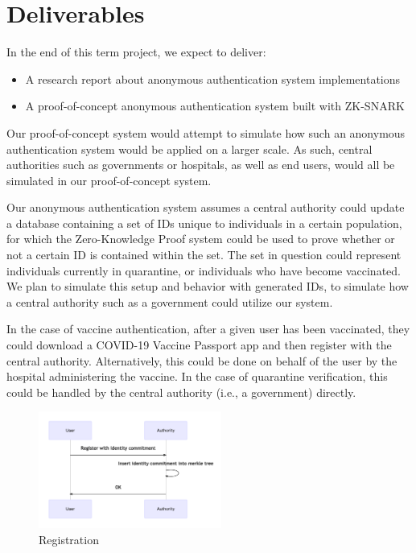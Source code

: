 \documentclass[sigconf, nonacm=true]{acmart}
\begin{document}
\section{Deliverables}
In the end of this term project, we expect to deliver:
\begin{itemize}
    \item A research report about anonymous authentication system implementations
    \item A proof-of-concept anonymous authentication system built with ZK-SNARK
\end{itemize}

Our proof-of-concept system would attempt to simulate how such an anonymous authentication system would be applied on a larger scale. As such, central authorities such as governments or hospitals, as well as end users, would all be simulated in our proof-of-concept system.

Our anonymous authentication system assumes a central authority could update a database containing a set of IDs unique to individuals in a certain population, for which the Zero-Knowledge Proof system could be used to prove whether or not a certain ID is contained within the set. The set in question could represent individuals currently in quarantine, or individuals who have become vaccinated. We plan to simulate this setup and behavior with generated IDs, to simulate how a central authority such as a government could utilize our system.

In the case of vaccine authentication, after a given user has been vaccinated, they could download a COVID-19 Vaccine Passport app and then register with the central authority. Alternatively, this could be done on behalf of the user by the hospital administering the vaccine. In the case of quarantine verification, this could be handled by the central authority (i.e., a government) directly.

\begin{figure}[H]
    \centering
    \includegraphics[width=6cm]{image/registration.png}
    \caption{Registration}
    \label{fig:reg}
\end{figure}
\end{document}
